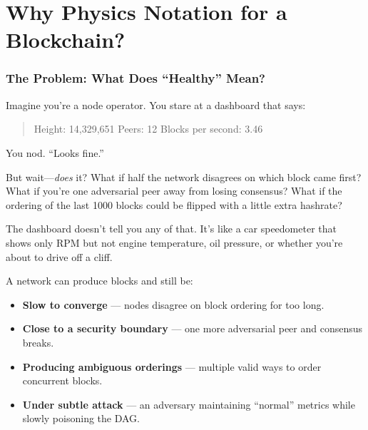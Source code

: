 \documentclass[11pt,a4paper]{article}
\begin{document}
\tableofcontents
\newpage

\part{Why Physics Notation for a Blockchain?}

\section{The Problem: What Does ``Healthy'' Mean?}

Imagine you're a node operator. You stare at a dashboard that says:

\begin{quote}
Height: 14,329,651 \quad Peers: 12 \quad Blocks per second: 3.46
\end{quote}

You nod. ``Looks fine.''

But wait---\emph{does} it? What if half the network disagrees on which block came first? What if you're one adversarial peer away from losing consensus? What if the ordering of the last 1000 blocks could be flipped with a little extra hashrate?

The dashboard doesn't tell you any of that. It's like a car speedometer that shows only RPM but not engine temperature, oil pressure, or whether you're about to drive off a cliff.

A network can produce blocks and still be:

\begin{itemize}
    \item \textbf{Slow to converge} --- nodes disagree on block ordering for too long.
    \item \textbf{Close to a security boundary} --- one more adversarial peer and consensus breaks.
    \item \textbf{Producing ambiguous orderings} --- multiple valid ways to order concurrent blocks.
    \item \textbf{Under subtle attack} --- an adversary maintaining ``normal'' metrics while slowly poisoning the DAG.
\end{itemize}
\end{document}
